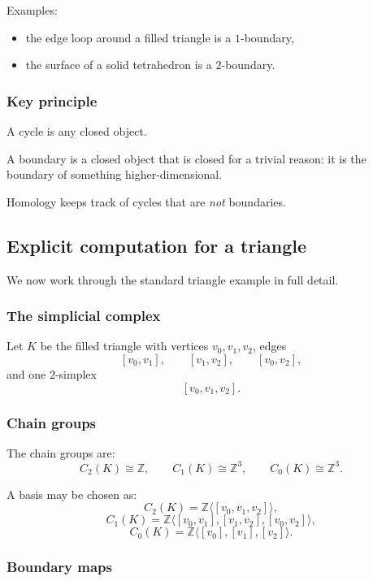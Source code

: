 \documentclass[12pt,a4paper]{article}
\theoremstyle{notespace}
\begin{document}
Examples:
\begin{itemize}
	\item the edge loop around a filled triangle is a \(1\)-boundary,
	\item the surface of a solid tetrahedron is a \(2\)-boundary.
\end{itemize}

\subsubsection{Key principle}

A cycle is any closed object.

A boundary is a closed object that is closed for a trivial reason: it is the boundary of something higher-dimensional.

Homology keeps track of cycles that are \emph{not} boundaries.

\subsection{Explicit computation for a triangle}

We now work through the standard triangle example in full detail.

\subsubsection{The simplicial complex}

Let \(K\) be the filled triangle with vertices \(v_0,v_1,v_2\), edges
\[
[v_0,v_1],\qquad [v_1,v_2],\qquad [v_0,v_2],
\]
and one \(2\)-simplex
\[
[v_0,v_1,v_2].
\]

\subsubsection{Chain groups}

The chain groups are:
\[
C_2(K)\cong \mathbb{Z},
\qquad
C_1(K)\cong \mathbb{Z}^3,
\qquad
C_0(K)\cong \mathbb{Z}^3.
\]

A basis may be chosen as:
\[
C_2(K)=\mathbb{Z}\langle [v_0,v_1,v_2]\rangle,
\]
\[
C_1(K)=\mathbb{Z}\langle [v_0,v_1],[v_1,v_2],[v_0,v_2]\rangle,
\]
\[
C_0(K)=\mathbb{Z}\langle [v_0],[v_1],[v_2]\rangle.
\]

\subsubsection{Boundary maps}
\end{document}
